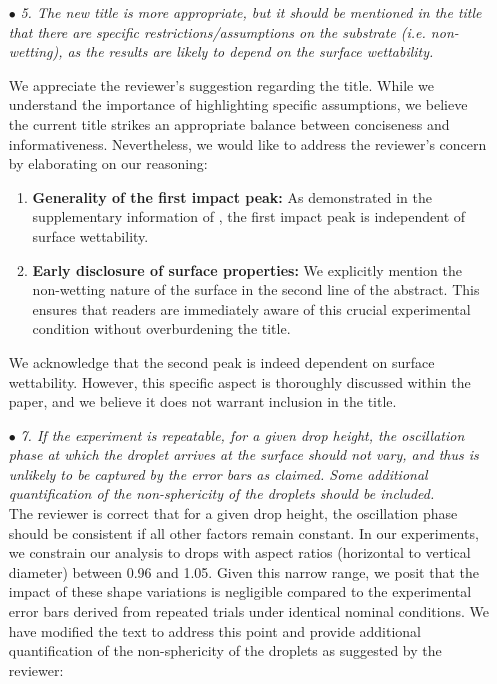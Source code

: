 \documentclass[]{article}
\begin{document}
\begin{enumerate}
	\item[$\bullet$] \textit{5. The new title is more appropriate, but it should be mentioned in the title that there are specific restrictions/assumptions on the substrate (i.e. non-wetting), as the results are likely to depend on the surface wettability.}
	
	We appreciate the reviewer's suggestion regarding the title. While we understand the importance of highlighting specific assumptions, we believe the current title strikes an appropriate balance between conciseness and informativeness. Nevertheless, we would like to address the reviewer's concern by elaborating on our reasoning:
	
	\begin{enumerate}
		\item \textbf{Generality of the first impact peak:} As demonstrated in the supplementary information of \citet{zhang2022impact}, the first impact peak is independent of surface wettability. 
		\item \textbf{Early disclosure of surface properties:} We explicitly mention the non-wetting nature of the surface in the second line of the abstract. This ensures that readers are immediately aware of this crucial experimental condition without overburdening the title.
	\end{enumerate}
	
	We acknowledge that the second peak is indeed dependent on surface wettability. However, this specific aspect is thoroughly discussed within the paper, and we believe it does not warrant inclusion in the title.
	
	\item[$\bullet$] \textit{7. If the experiment is repeatable, for a given drop height, the oscillation phase at which the droplet arrives at the surface should not vary, and thus is unlikely to be captured by the error bars as claimed. Some additional quantification of the non-sphericity of the droplets should be included.}\\[1 mm]
	
	The reviewer is correct that for a given drop height, the oscillation phase should be consistent if all other factors remain constant. In our experiments, we constrain our analysis to drops with aspect ratios (horizontal to vertical diameter) between 0.96 and 1.05. Given this narrow range, we posit that the impact of these shape variations is negligible compared to the experimental error bars derived from repeated trials under identical nominal conditions. We have modified the text to address this point and provide additional quantification of the non-sphericity of the droplets as suggested by the reviewer: 
	

\end{enumerate}
\end{document}
